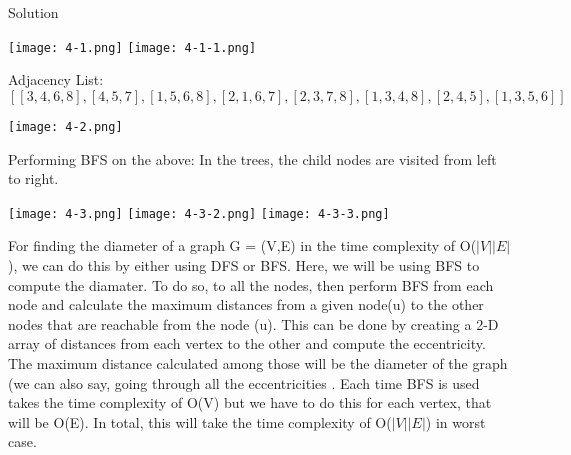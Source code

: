 \documentclass[12pt,twoside]{article}
\begin{document}


\begin{problems}

\problem  %

\begin{problemparts}
\problempart %
Solution
\begin{center}
  \texttt{[image: 4-1.png]}
  \texttt{[image: 4-1-1.png]}
\end{center}


\problempart %
Adjacency List:
\[[[3, 4, 6, 8], [4, 5, 7], [1, 5, 6, 8], [2, 1, 6, 7], [2, 3, 7, 8], [1, 3, 4, 8], [2, 4, 5], [1, 3, 5, 6]]\]
\begin{center}
  \texttt{[image: 4-2.png]}
  
\end{center}
\problempart %
Performing BFS on the above:
In the trees, the child nodes are visited from left to right.

\begin{center}
  \texttt{[image: 4-3.png]}
  \texttt{[image: 4-3-2.png]}
  \texttt{[image: 4-3-3.png]}
\end{center}

\problempart %
\end{problemparts}

\newpage
\problem  %

\begin{problemparts}
\problempart %
For finding the diameter of a graph G = (V,E) in the time complexity of O($|V||E|$), we can do this by either using DFS or BFS. Here, we will be using BFS to compute the diamater. To do so, to all the nodes, then perform BFS from each node and calculate the maximum distances from a given node(u) to the other  nodes that are reachable from the node (u). This can be done by creating a 2-D array of distances from each vertex to the other and compute the eccentricity. The maximum distance calculated among those will be the diameter of the graph (we can also say, going through all the eccentricities .
Each time BFS is used takes the time complexity of O(V) but we have to do this for each vertex, that will be O(E). In total, this will take the time complexity of O($|V||E|$) in worst case.



\end{problemparts}
\end{problems}
\end{document}
